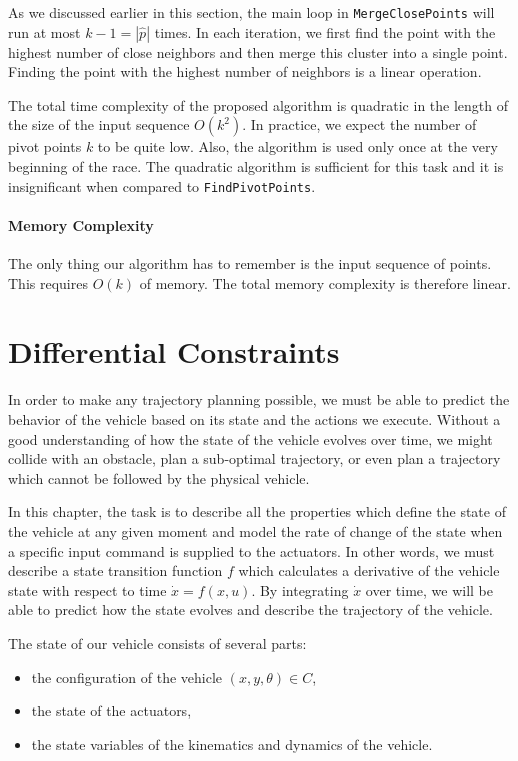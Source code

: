 As we discussed earlier in this section, the main loop in \texttt{MergeClosePoints} will run at most $k-1=|\hat{p}|$ times. In each iteration, we first find the point with the highest number of close neighbors and then merge this cluster into a single point. Finding the point with the highest number of neighbors is a linear operation.

The total time complexity of the proposed algorithm is quadratic in the length of the size of the input sequence $O(k^2)$. In practice, we expect the number of pivot points $k$ to be quite low. Also, the algorithm is used only once at the very beginning of the race. The quadratic algorithm is sufficient for this task and it is insignificant when compared to \texttt{FindPivotPoints}.

\paragraph{Memory Complexity}
The only thing our algorithm has to remember is the input sequence of points. This requires $O(k)$ of memory. The total memory complexity is therefore linear.

\section{Differential Constraints}
\label{sec:vehicle_model}

In order to make any trajectory planning possible, we must be able to predict the behavior of the vehicle based on its state and the actions we execute. Without a good understanding of how the state of the vehicle evolves over time, we might collide with an obstacle, plan a sub-optimal trajectory, or even plan a trajectory which cannot be followed by the physical vehicle.

In this chapter, the task is to describe all the properties which define the state of the vehicle at any given moment and model the rate of change of the state when a specific input command is supplied to the actuators. In other words, we must describe a state transition function $f$ which calculates a derivative of the vehicle state with respect to time $\dot{x}=f(x, u)$. By integrating $\dot{x}$ over time, we will be able to predict how the state evolves and describe the trajectory of the vehicle.

The state of our vehicle consists of several parts:
\begin{itemize}
	\item the configuration of the vehicle $(x, y, \theta)\in C$,
	\item the state of the actuators,
	\item the state variables of the kinematics and dynamics of the vehicle.
\end{itemize}

